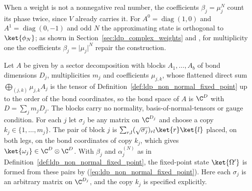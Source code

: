 \begin{definition}
    When a weight is not a nonnegative real number, the coefficients
    $\beta_j=\mu_j^N$ count its phase twice, since $V$ already carries it. For
    $A^0=\operatorname{diag}(1,0)$ and $A^1=\operatorname{diag}(0,-1)$ and odd $N$
    the approximating state is orthogonal to $\ket{\phi_N}$; as shown in
    Section~\ref{sec:ldp_complex_weights} and
    \cite{gap:mswc24_block_form_mixed_overlap}, for multiplicity one the
    coefficients $\beta_j=\lvert\mu_j\rvert^N$ repair the construction.
\end{definition}

\begin{definition}
    \label{def:ldp_sector_fixed_point_state}
    \leanok
    Let $A$ be given by a sector decomposition with blocks $A_1,\dots,A_b$ of
    bond dimensions $D_j$, multiplicities $m_j$ and coefficients $\mu_{j,k}$,
    whose flattened direct sum $\bigoplus_{(j,k)}\mu_{j,k}A_j$ is the tensor of
    Definition~\ref{def:ldp_non_normal_fixed_point} up to the order of the
    bond coordinates, so the bond space of $A$ is $\C^D$ with
    $D=\sum_jm_jD_j$. The blocks carry no normality, basis-of-normal-tensors
    or gauge condition. For each $j$ let $\sigma_j$ be any matrix on
    $\C^{D_j}$ and choose a copy $k_j\in\{1,\dots,m_j\}$. The pair of block
    $j$ is $\sum_{r,l}(\sqrt{\sigma_j})_{rl}\ket{r}\ket{l}$ placed, on both
    legs, on the bond coordinates of copy $k_j$, which gives
    $\ket{\omega_j}\in\C^D\otimes\C^D$. With $\beta_j$ and $\alpha^{(N)}_j$ as
    in Definition~\ref{def:ldp_non_normal_fixed_point}, the fixed-point state
    $\ket{\Omega'}$ is formed from these pairs by
    (\ref{eq:ldp_non_normal_fixed_point}). Here each $\sigma_j$ is an arbitrary
    matrix on $\C^{D_j}$, and the copy $k_j$ is specified explicitly.
\end{definition}

